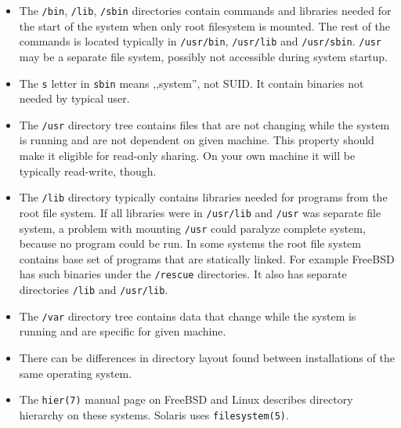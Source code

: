 \begin{itemize}
\item The \texttt{/bin}, \texttt{/lib}, \texttt{/sbin} directories contain
commands and libraries needed for the start of the system when only root
filesystem is mounted. The rest of the commands is located typically in
\texttt{/usr/bin}, \texttt{/usr/lib} and \texttt{/usr/sbin}.
\texttt{/usr} may be a separate file system, possibly not accessible during
system startup.
\item The \texttt{s} letter in \texttt{sbin} means ,,system'', not SUID.
It contain binaries not needed by typical user.
\item The \texttt{/usr} directory tree contains files that are not changing
while the system is running and are not dependent on given machine.
This property should make it eligible for read-only sharing. On your own
machine it will be typically read-write, though.
\item The \texttt{/lib} directory typically contains libraries needed for
programs from the root file system. If all libraries were in \texttt{/usr/lib}
and \texttt{/usr} was separate file system, a problem with mounting
\texttt{/usr} could paralyze complete system, because no program could be run.
In some systems the root file system contains base set of programs that are
statically linked. For example FreeBSD has such binaries under the
\texttt{/rescue} directories. It also has separate directories \texttt{/lib} and
\texttt{/usr/lib}.
\item The \texttt{/var} directory tree contains data that change while the
system is running and are specific for given machine.
\item There can be differences in directory layout found between installations
of the same operating system.
\item The \texttt{hier(7)} manual page on FreeBSD and Linux describes directory
hierarchy on these systems. Solaris uses \texttt{filesystem(5)}.
\end{itemize}


